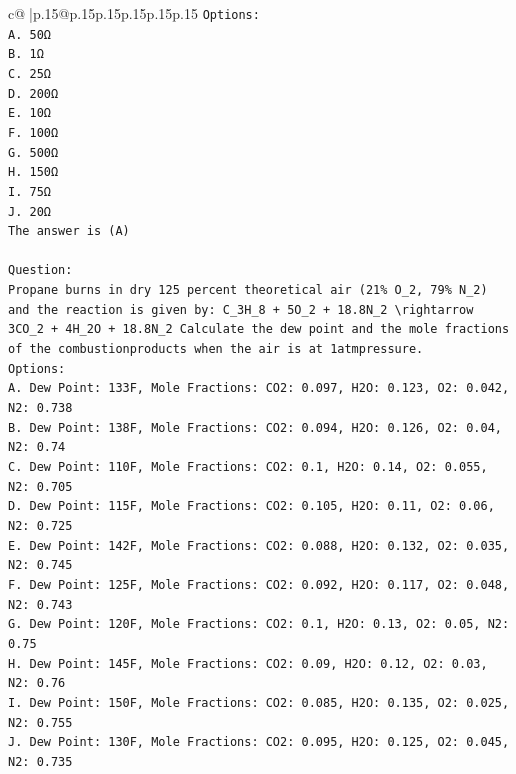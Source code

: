 \documentclass{article}
\begin{document}
{\begin{supertabular}{c@{$\;$}|p{.15\linewidth}@{}p{.15\linewidth}p{.15\linewidth}p{.15\linewidth}p{.15\linewidth}p{.15\linewidth}}
{{{\texttt{Options:} \\
\texttt{A. 50Ω} \\
\texttt{B. 1Ω} \\
\texttt{C. 25Ω} \\
\texttt{D. 200Ω} \\
\texttt{E. 10Ω} \\
\texttt{F. 100Ω} \\
\texttt{G. 500Ω} \\
\texttt{H. 150Ω} \\
\texttt{I. 75Ω} \\
\texttt{J. 20Ω} \\
\texttt{The answer is (A)} \\
\\ 
\texttt{Question:} \\
\texttt{Propane burns in dry 125 percent theoretical air (21\% O\_2, 79\% N\_2) and the reaction is given by: C\_3H\_8 + 5O\_2 + 18.8N\_2 \textbackslash{}rightarrow 3CO\_2 + 4H\_2O + 18.8N\_2 Calculate the dew point and the mole fractions of the combustionproducts when the air is at 1atmpressure.} \\
\texttt{Options:} \\
\texttt{A. Dew Point: 133F, Mole Fractions: CO2: 0.097, H2O: 0.123, O2: 0.042, N2: 0.738} \\
\texttt{B. Dew Point: 138F, Mole Fractions: CO2: 0.094, H2O: 0.126, O2: 0.04, N2: 0.74} \\
\texttt{C. Dew Point: 110F, Mole Fractions: CO2: 0.1, H2O: 0.14, O2: 0.055, N2: 0.705} \\
\texttt{D. Dew Point: 115F, Mole Fractions: CO2: 0.105, H2O: 0.11, O2: 0.06, N2: 0.725} \\
\texttt{E. Dew Point: 142F, Mole Fractions: CO2: 0.088, H2O: 0.132, O2: 0.035, N2: 0.745} \\
\texttt{F. Dew Point: 125F, Mole Fractions: CO2: 0.092, H2O: 0.117, O2: 0.048, N2: 0.743} \\
\texttt{G. Dew Point: 120F, Mole Fractions: CO2: 0.1, H2O: 0.13, O2: 0.05, N2: 0.75} \\
\texttt{H. Dew Point: 145F, Mole Fractions: CO2: 0.09, H2O: 0.12, O2: 0.03, N2: 0.76} \\
\texttt{I. Dew Point: 150F, Mole Fractions: CO2: 0.085, H2O: 0.135, O2: 0.025, N2: 0.755} \\
\texttt{J. Dew Point: 130F, Mole Fractions: CO2: 0.095, H2O: 0.125, O2: 0.045, N2: 0.735} \\
            }
        }
    }
     \\ \\


\end{supertabular}}
\end{document}
